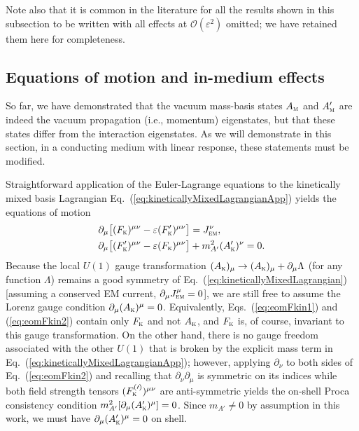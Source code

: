 \documentclass[amsmath,amssymb,aps,10pt,prd,letterpaper,nofootinbib,balancelastpage,notitlepage,superscriptaddress,twocolumn,floatfix]{revtex4-2}
\renewcommand{\eqref}[2][]{Eq{#1}.~(\ref{eq:#2})}	%
\newcommand{\kin}[1]{({#1}_{\textsc{k}})}
\newcommand{\primekin}[1]{({#1}_{\textsc{k}}^\prime)}
\begin{document}
Note also that it is common in the literature for all the results shown in this subsection to be written with all effects at $\mathcal{O}(\varepsilon^2)$ omitted; we have retained them here for completeness.


\subsection{Equations of motion and in-medium effects}
\label{app:EoMandInMedium}

So far, we have demonstrated that the vacuum mass-basis states $A_{\textsc{m}}$ and $A'_{\textsc{m}}$ are indeed the vacuum propagation (i.e., momentum) eigenstates, but that these states differ from the interaction eigenstates.
As we will demonstrate in this section, in a conducting medium with linear response, these statements must be modified.

Straightforward application of the Euler-Lagrange equations to the kinetically mixed basis Lagrangian \eqref{kineticallyMixedLagrangianApp} yields the equations of motion
\begin{align}
    \partial_\mu\big[ \kin{F}^{\mu\nu} - \varepsilon \primekin{F}^{\mu\nu} \big] &= J_{\textsc{em}}^{\nu},  \label{eq:eomFkin1} \\
    \partial_\mu\big[ \primekin{F}^{\mu\nu} - \varepsilon \kin{F}^{\mu\nu} \big] &+ m_{A'}^2 \primekin{A}^{\nu} = 0.   \label{eq:eomFkin2}
\end{align}
Because the local $U(1)$ gauge transformation $\kin{A}_\mu \rightarrow \kin{A}_\mu + \partial_\mu \Lambda$ (for any function $\Lambda$) remains a good symmetry of \eqref{kineticallyMixedLagrangian} [assuming a conserved EM current, $\partial_\mu J^{\mu}_{\textsc{em}} = 0$], we are still free to assume the Lorenz gauge condition $\partial_\mu \kin{A}^\mu = 0$.
Equivalently, \eqref[s]{eomFkin1} and (\ref{eq:eomFkin2}) contain only $F_{\textsc{k}}$ and not $A_{\textsc{k}}$, and $F_{\textsc{k}}$ is, of course, invariant to this gauge transformation.
On the other hand, there is no gauge freedom associated with the other $U(1)$ that is broken by the explicit mass term in \eqref{kineticallyMixedLagrangianApp}; however, applying $\partial_\nu$ to both sides of \eqref{eomFkin2} and recalling that $\partial_{\nu}\partial_{\mu}$ is symmetric on its indices while both field strength tensors $(F_{\textsc{k}}^{(\prime)})^{\mu\nu}$ are anti-symmetric yields the on-shell Proca consistency condition $m_{A'}^2[ \partial_\mu \primekin{A}^\mu ] = 0$.
Since $m_{A'}\neq0$ by assumption in this work, we must have $\partial_\mu \primekin{A}^\mu = 0$ on shell.
\end{document}
